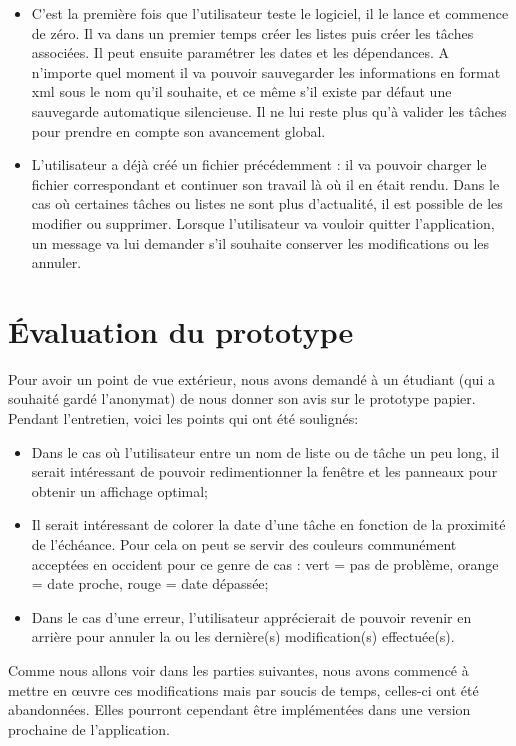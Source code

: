 		\begin{itemize}
			\item C'est la première fois que l'utilisateur teste le logiciel, il le lance et commence de zéro. Il va dans un premier temps créer les listes puis créer les tâches associées. Il peut ensuite paramétrer les dates et les dépendances. A n'importe quel moment il va pouvoir sauvegarder les informations en format xml sous le nom qu'il souhaite, et ce même s'il existe par défaut une sauvegarde automatique silencieuse. Il ne lui reste plus qu'à valider les tâches pour prendre en compte son avancement global.
			\item L'utilisateur a déjà créé un fichier précédemment : il va pouvoir charger le fichier correspondant et continuer son travail là où il en était rendu. Dans le cas où certaines tâches ou listes ne sont plus d'actualité, il est possible de les modifier ou supprimer. Lorsque l'utilisateur va vouloir quitter l'application, un message va lui demander s'il souhaite conserver les modifications ou les annuler. 
		\end{itemize}
	
	\newpage
	\section{Évaluation du prototype}
		Pour avoir un point de vue extérieur, nous avons demandé à un étudiant (qui a souhaité gardé l'anonymat) de nous donner son avis sur le prototype papier. Pendant l'entretien, voici les points qui ont été soulignés:
		\begin{itemize}
			\item Dans le cas où l'utilisateur entre un nom de liste ou de tâche un peu long, il serait intéressant de pouvoir redimentionner la fenêtre et les panneaux pour obtenir un affichage optimal; 
			\item Il serait intéressant de colorer la date d'une tâche en fonction de la proximité de l'échéance. Pour cela on peut se servir des couleurs communément acceptées en occident pour ce genre de cas : vert = pas de problème, orange = date proche, rouge = date dépassée; 
			\item Dans le cas d'une erreur, l'utilisateur apprécierait de pouvoir revenir en arrière pour annuler la ou les dernière(s) modification(s) effectuée(s). \\
		\end{itemize}
		
		Comme nous allons voir dans les parties suivantes, nous avons commencé à mettre en {\oe}uvre ces modifications mais par soucis de temps, celles-ci ont été abandonnées. Elles pourront cependant être implémentées dans une version prochaine de l'application.
		

